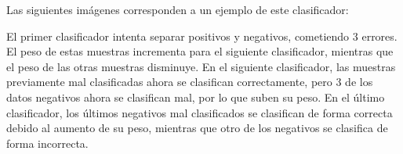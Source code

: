 Las siguientes imágenes corresponden a un ejemplo de este clasificador:

\begin{figure}[ht]
	\centering
		\label{fig: Clasificadores Adaboost.}
\end{figure}


El primer clasificador intenta separar positivos y negativos, cometiendo 3 errores. El peso de estas muestras incrementa para el siguiente clasificador, mientras que el peso de las otras muestras disminuye.
En el siguiente clasificador, las muestras previamente mal clasificadas ahora se clasifican correctamente, pero 3 de los datos negativos ahora se clasifican mal, por lo que suben su peso. 
En el último clasificador, los últimos negativos mal clasificados se clasifican de forma correcta debido al aumento de su peso, mientras que otro de los negativos se clasifica de forma incorrecta.

